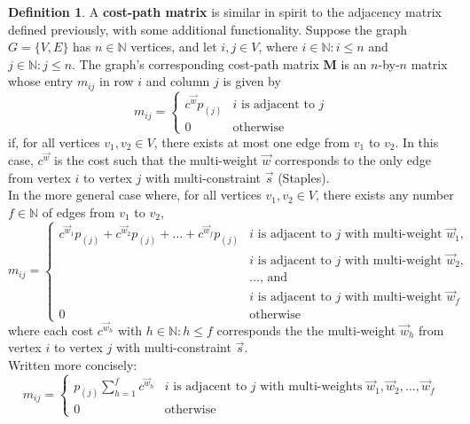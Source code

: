 \documentclass[12pt]{amsart}
\theoremstyle{definition}
\newtheorem{definition}[thm]{Definition}
\theoremstyle{remark}
\numberwithin{equation}{section}
\newcommand{\N}{\mathbb{N}}
\begin{document}
\begin{definition}
A \textbf{cost-path matrix} is similar in spirit to the adjacency matrix defined previously, with some additional functionality. Suppose the graph $G = \{V,E\}$ has $n \in \N$ vertices, and let $i, j \in V$, where  $i \in \N : i \le n$ and $j \in \N : j \le n$. The graph's corresponding cost-path matrix $\mathbf{M}$ is an $n$-by-$n$ matrix whose entry $m_{ij}$ in row $i$ and column $j$ is given by
$$
	m_{ij} = \left\{
		\begin{array}{ll}
			c^{\vec{w}} p_{(j)} & i \text{ is adjacent to } j \\
			0             & \text{otherwise}
		\end{array}
	\right.
$$
if, for all vertices $v_1, v_2 \in V$, there exists at most one edge from $v_1$ to $v_2$. In this case, $c^{\vec{w}}$ is the cost such that the multi-weight $\vec{w}$ corresponds to the only edge from vertex $i$ to vertex $j$ with multi-constraint $\vec{s}$ (Staples).\\
In the more general case where, for all vertices $v_1, v_2 \in V$, there exists any number $f \in \N$ of edges from $v_1$ to $v_2$,
$$
	m_{ij} = \left\{
		\begin{array}{ll}
			c^{\vec{w}_1} p_{(j)} + c^{\vec{w}_2} p_{(j)} + \ldots + c^{\vec{w}_f} p_{(j)} & i \text{ is adjacent to } j \text{ with multi-weight } \vec{w}_1 \text{,} \\
			& i \text{ is adjacent to } j \text{ with multi-weight } \vec{w}_2 \text{,} \\
			& \ldots \text{, and} \\
			& i \text{ is adjacent to } j \text{ with multi-weight } \vec{w}_f \\
			0             & \text{otherwise}
		\end{array}
	\right.
$$
where each cost $c^{\vec{w}_h}$ with $h \in \N : h \le f$ corresponds the the multi-weight $\vec{w}_h$ from vertex $i$ to vertex $j$ with multi-constraint $\vec{s}$.\\
Written more concisely:
$$
	m_{ij} = \left\{
		\begin{array}{ll}
			p_{(j)} \displaystyle\sum_{h=1}^f c^{\vec{w}_h} & i \text{ is adjacent to } j \text{ with multi-weights } \vec{w}_1, \vec{w}_2, \ldots, \vec{w}_f \\
			0             & \text{otherwise}
		\end{array}
	\right.
$$
\end{definition}
\end{document}
